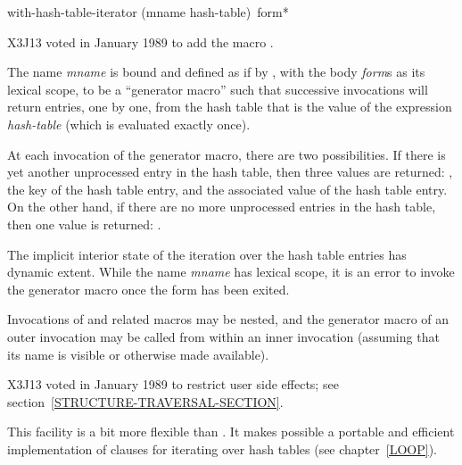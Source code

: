 \begin{new}
\begin{defmac}
with-hash-table-iterator (mname hash-table) {\,form}*

X3J13 voted in January 1989
to add the macro .

The name {\it mname} is bound and defined as if by ,
with the body {\it form\/}s as its lexical scope, to be a ``generator macro''
such that successive invocations  will
return entries, one by one, from the hash table that is the value of the
expression {\it hash-table} (which is evaluated exactly once).

At each invocation of the generator macro, there are two possibilities.
If there is yet another unprocessed entry in the hash table, then
three values are returned: ,
the key of the hash table entry, and
the associated value of the hash table entry.
On the other hand, if there are no more unprocessed entries in the
hash table, then one value is returned: .

The implicit interior state of the iteration over the hash table
entries has dynamic extent.  While the name {\it mname} has
lexical scope, it is an error to invoke the generator macro
once the  form has been exited.

Invocations of 
and related macros may be nested, and the generator macro of an
outer invocation may be called from within an inner invocation
(assuming that its name is visible or otherwise made available).

\begin{new}
X3J13 voted in January 1989
to restrict user side effects; see section~\ref{STRUCTURE-TRAVERSAL-SECTION}.
\end{new}

\beforenoterule
\begin{rationale}
This facility is a bit more flexible than .
It makes possible a portable and efficient implementation of 
clauses for iterating over hash tables (see chapter~\ref{LOOP}).
\end{rationale}
\afternoterule
\end{defmac}

\newpage%


\end{new}
